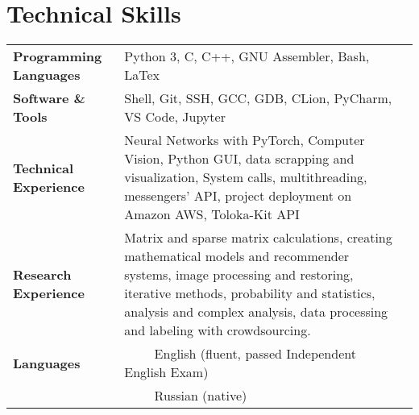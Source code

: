 \documentclass[11pt, a4paper]{article}
\begin{document}
\section*{Technical Skills}
\begin{tabular}{ l p{12cm}l }
    \textbf{Programming Languages} & Python 3, C, C++, GNU Assembler, Bash, LaTex \\ [0.8ex]
    \textbf{Software \& Tools} & Shell, Git, SSH, GCC, GDB, CLion, PyCharm, VS Code, Jupyter \\ [0.8ex]
    \textbf{Technical Experience} & Neural Networks with PyTorch, Computer Vision, Python GUI, 
    data scrapping and visualization, System calls, multithreading, messengers' API, 
    project deployment on Amazon AWS, Toloka-Kit API \\ [0.8ex]
    \textbf{Research Experience} & Matrix and sparse matrix calculations, creating mathematical models and recommender systems, 
    image processing and restoring, iterative methods, probability and statistics, analysis and complex analysis, data processing and labeling with crowdsourcing. \\ [0.8ex]
    \textbf{Languages} & ~~\llap{\textbullet}~~ English (fluent, passed Independent English Exam) \\
    & ~~\llap{\textbullet}~~ Russian (native)
\end{tabular}
\end{document}
